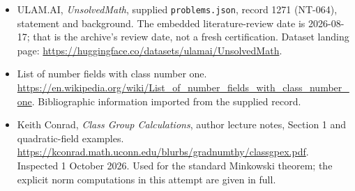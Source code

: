 \documentclass[11pt,a4paper]{article}
\begin{document}
{\small

\begin{itemize}

\item[\hypertarget{source:1271:1}{S1}] ULAM.AI, \emph{UnsolvedMath}, supplied \texttt{problems.json}, record 1271 (NT-064), statement and background. The embedded literature-review date is 2026-08-17; that is the archive’s review date, not a fresh certification. Dataset landing page: \url{https://huggingface.co/datasets/ulamai/UnsolvedMath}.

\item[\hypertarget{source:1271:2}{S2}] List of number fields with class number one. \url{https://en.wikipedia.org/wiki/List_of_number_fields_with_class_number_one}. Bibliographic information imported from the supplied record.


\item[E1] Keith Conrad, \emph{Class Group Calculations},
author lecture notes, Section 1 and quadratic-field examples.
\url{https://kconrad.math.uconn.edu/blurbs/gradnumthy/classgpex.pdf}.
Inspected 1 October 2026. Used for the standard Minkowski theorem;
the explicit norm computations in this attempt are given in full.

\end{itemize}

}

\label{end:1271}
\end{document}
